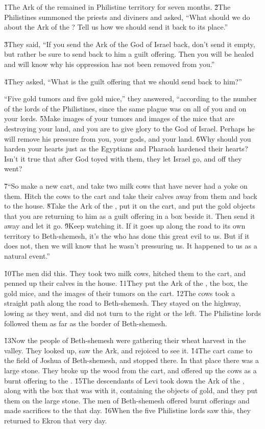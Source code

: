 \v{1}The Ark of the  remained in Philistine territory for seven months. \v{2}The Philistines summoned the priests and diviners and asked, ``What should we do about the Ark of the ? Tell us how we should send it back to its place.''

\v{3}They said, ``If you send the Ark of the God of Israel back, don't send it empty, but rather be sure to send back to him a guilt offering. Then you will be healed and will know why his oppression has not been removed from you.''

\v{4}They asked, ``What is the guilt offering that we should send back to him?''

``Five gold tumors and five gold mice,'' they answered, ``according to the number of the lords of the Philistines, since the same plague was on all of you and on your lords. \v{5}Make images of your tumors and images of the mice that are destroying your land, and you are to give glory to the God of Israel. Perhaps he will remove his pressure from you, your gods, and your land. \v{6}Why should you harden your hearts just as the Egyptians and Pharaoh hardened their hearts? Isn't it true that after God toyed with them, they let Israel go, and off they went?

\v{7}``So make a new cart, and take two milk cows that have never had a yoke on them. Hitch the cows to the cart and take their calves away from them and back to the house. \v{8}Take the Ark of the , put it on the cart, and put the gold objects that you are returning to him as a guilt offering in a box beside it. Then send it away and let it go. \v{9}Keep watching it. If it goes up along the road to its own territory to Beth-shemesh, it's the  who has done this great evil to us. But if it does not, then we will know that he wasn't pressuring us. It happened to us as a natural event.''

\v{10}The men did this. They took two milk cows, hitched them to the cart, and penned up their calves in the house. \v{11}They put the Ark of the , the box, the gold mice, and the images of their tumors on the cart. \v{12}The cows took a straight path along the road to Beth-shemesh. They stayed on the highway, lowing as they went, and did not turn to the right or the left. The Philistine lords followed them as far as the border of Beth-shemesh.

\v{13}Now the people of Beth-shemesh were gathering their wheat harvest in the valley. They looked up, saw the Ark, and rejoiced to see it. \v{14}The cart came to the field of Joshua of Beth-shemesh, and stopped there. In that place there was a large stone. They broke up the wood from the cart, and offered up the cows as a burnt offering to the . \v{15}The descendants of Levi took down the Ark of the , along with the box that was with it, containing the objects of gold, and they put them on the large stone. The men of Beth-shemesh offered burnt offerings and made sacrifices to the  that day. \v{16}When the five Philistine lords saw this, they returned to Ekron that very day.


